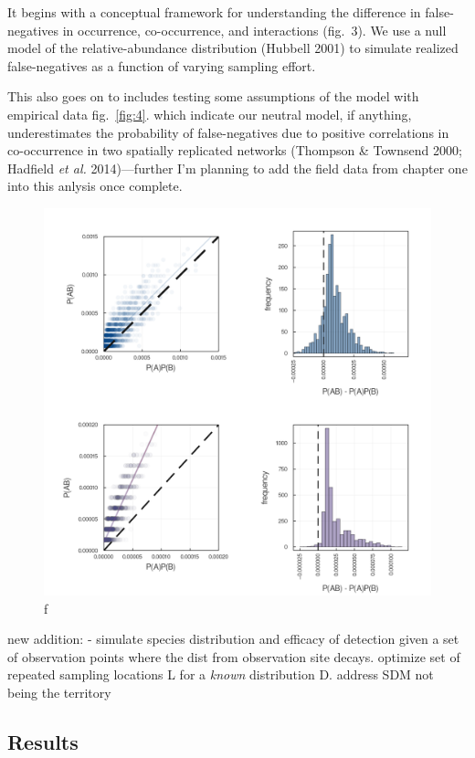 \documentclass[11pt]{article}
\makeatletter
\def\maxwidth{\ifdim\Gin@nat@width>\linewidth\linewidth
\else\Gin@nat@width\fi}
\let\Oldincludegraphics\includegraphics
\renewcommand{\includegraphics}[1]{\Oldincludegraphics[width=\maxwidth]{#1}}
\makeatother
\begin{document}
It begins with a conceptual framework for understanding the difference
in false-negatives in occurrence, co-occurrence, and interactions
(fig.~3). We use a null model of the relative-abundance distribution
(Hubbell 2001) to simulate realized false-negatives as a function of
varying sampling effort.

This also goes on to includes testing some assumptions of the model with
empirical data fig.~\ref{fig:4}. which indicate our neutral model, if
anything, underestimates the probability of false-negatives due to
positive correlations in co-occurrence in two spatially replicated
networks (Thompson \& Townsend 2000; Hadfield \emph{et al.}
2014)---further I'm planning to add the field data from chapter one into
this anlysis once complete.

\begin{figure}
\centering
\includegraphics{./figures/positiveassociations.png}
\caption{f}
\end{figure}

new addition: - simulate species distribution and efficacy of detection
given a set of observation points where the dist from observation site
decays. optimize set of repeated sampling locations L for a \emph{known}
distribution D. address SDM not being the territory

\hypertarget{results}{%
\subsection{Results}\label{results}}
\end{document}
